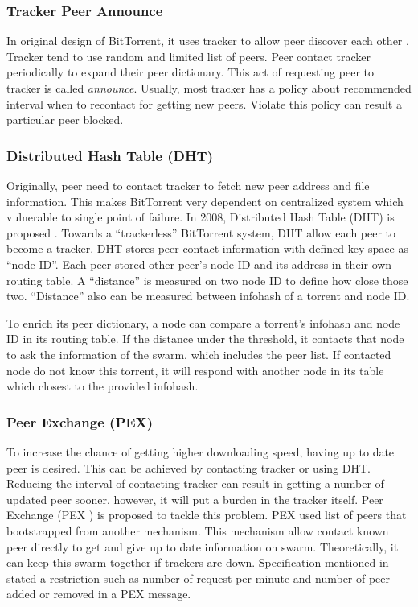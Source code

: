 \subsubsection{Tracker Peer Announce}
In original design of BitTorrent, it uses tracker to allow peer discover each other \cite{2003:bittorrent:cohen}. Tracker tend to use random and limited list of peers. Peer contact tracker periodically to expand their peer dictionary. This act of requesting peer to tracker is called \textit{announce}.	Usually, most tracker has a policy about recommended interval when to recontact for getting new peers. Violate this policy can result a particular peer blocked.

\subsubsection{Distributed Hash Table (DHT)}
Originally, peer need to contact tracker to fetch new peer address and file information. This makes BitTorrent very dependent on centralized system which vulnerable to single point of failure. In 2008, Distributed Hash Table (DHT) is proposed \cite{2008:DHT:loewenstern}. Towards a ``trackerless'' BitTorrent system, DHT allow each peer to become a tracker. DHT stores peer contact information with defined key-space as ``node ID''. Each peer stored other peer's node ID and its address in their own routing table. A ``distance'' is measured on two node ID to define how close those two. ``Distance'' also can be measured between infohash of a torrent and node ID.

To enrich its peer dictionary, a node can compare a torrent's infohash and node ID in its routing table. If the distance under the threshold, it contacts that node to ask the information of the swarm, which includes the peer list. If contacted node do not know this torrent, it will respond with another node in its table which closest to the provided infohash.

\subsubsection{Peer Exchange (PEX)}
To increase the chance of getting higher downloading speed, having up to date peer is desired. This can be achieved by contacting tracker or using DHT. Reducing the interval of contacting tracker can result in getting a number of updated peer sooner, however, it will put a burden in the tracker itself. Peer Exchange (PEX )\cite{2015:PEX:the8472} is proposed to tackle this problem. PEX used list of peers that bootstrapped from another mechanism. This mechanism allow contact known peer directly to get and give up to date information on swarm. Theoretically, it can keep this swarm together if trackers are down. Specification mentioned in \cite{2015:PEX:the8472} stated a restriction such as number of request per minute and number of peer added or removed in a PEX message.


